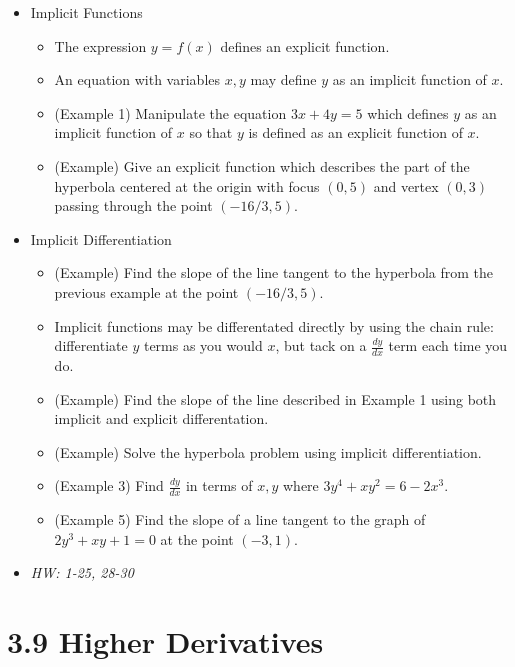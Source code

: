 \documentclass[11pt]{article}
\begin{document}
\begin{itemize}
\item Implicit Functions
  \begin{itemize}
    \item The expression \(y=f(x)\) defines an explicit function.
    \item An equation with variables \(x,y\) may define \(y\) as an
          implicit function of \(x\).
    \item (Example 1) Manipulate the equation \(3x+4y=5\) which defines
          \(y\) as an implicit function of \(x\) so that \(y\) is defined
          as an explicit function of \(x\).
    \item (Example) Give an explicit function which describes the part of
          the hyperbola centered at the origin
          with focus \((0,5)\) and vertex \((0,3)\) passing through
          the point \((-16/3,5)\).
  \end{itemize}
\item Implicit Differentiation
  \begin{itemize}
    \item (Example) Find the slope of the line tangent to the hyperbola
          from the previous example at the point \((-16/3,5)\).
    \item Implicit functions may be differentated directly by using the
          chain rule: differentiate \(y\) terms as you would \(x\), but
          tack on a \(\frac{dy}{dx}\) term each time you do.
    \item (Example) Find the slope of the line described in Example 1 using both
          implicit and explicit differentation.
    \item (Example) Solve the hyperbola problem using implicit differentiation.
    \item (Example 3) Find \(\frac{dy}{dx}\) in terms of \(x,y\) where
          \(3y^4+xy^2=6-2x^3\).
    \item (Example 5) Find the slope of a line tangent to the graph of
          \(2y^3+xy+1=0\) at the point \((-3,1)\).
  \end{itemize}
\item\textit{
  HW: 1-25, 28-30
}
\end{itemize}

\section*{3.9 Higher Derivatives}
\end{document}
